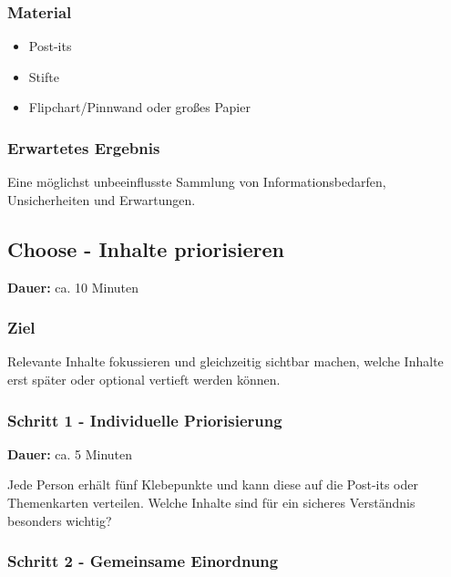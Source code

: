 \subsubsection*{Material}

\begin{itemize}
    \item Post-its
    \item Stifte
    \item Flipchart/Pinnwand oder großes Papier
\end{itemize}

\subsubsection*{Erwartetes Ergebnis}

Eine möglichst unbeeinflusste Sammlung von Informationsbedarfen,
Unsicherheiten und Erwartungen.


\clearpage

\subsection{Choose - Inhalte priorisieren}
\label{subsec:workshop-choose-inhalte}

\noindent
\textbf{Dauer:} ca. 10 Minuten

\subsubsection*{Ziel}

Relevante Inhalte fokussieren und gleichzeitig sichtbar
machen, welche Inhalte erst später oder optional vertieft werden können.


\subsubsection*{Schritt 1 - Individuelle Priorisierung}

\noindent
\textbf{Dauer:} ca. 5 Minuten

Jede Person erhält fünf Klebepunkte und kann diese auf die Post-its oder Themenkarten verteilen. Welche Inhalte sind für ein sicheres Verständnis besonders wichtig?


\subsubsection*{Schritt 2 - Gemeinsame Einordnung}

